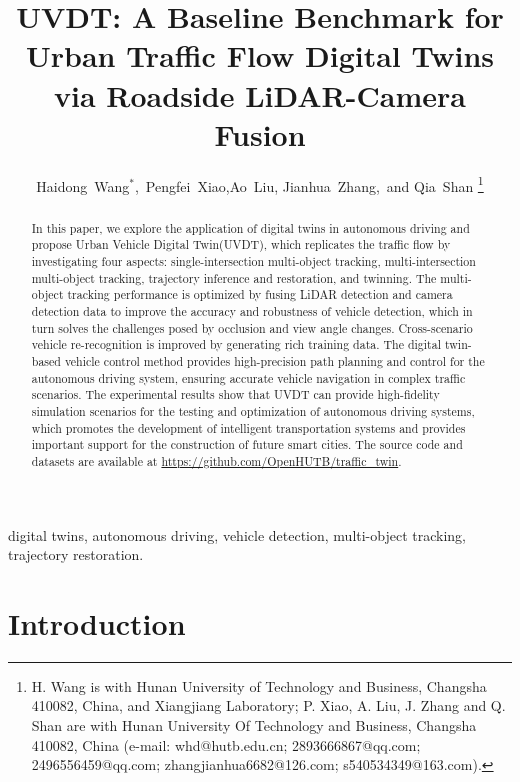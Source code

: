 \documentclass[journal,twoside,web]{ieeecolor}
\begin{document}
\title{UVDT: A Baseline Benchmark for Urban Traffic Flow Digital Twins via Roadside LiDAR-Camera Fusion}
\author{Haidong~Wang\(^*\),~Pengfei~Xiao,Ao~Liu, Jianhua~Zhang,~and Qia~Shan
\thanks{H. Wang is with Hunan University of Technology and Business, Changsha 410082, China, and Xiangjiang Laboratory; P. Xiao, A. Liu, J. Zhang and Q. Shan are with Hunan University Of Technology and Business, Changsha 410082, China (e-mail: whd@hutb.edu.cn; 2893666867@qq.com; 2496556459@qq.com; zhangjianhua6682@126.com; s540534349@163.com).}}

\maketitle

\begin{abstract}
In this paper, we explore the application of digital twins in autonomous driving and propose Urban Vehicle Digital Twin(UVDT), which replicates the traffic flow by investigating four aspects: single-intersection multi-object tracking, multi-intersection multi-object tracking, trajectory inference and restoration, and twinning. 
The multi-object tracking performance is optimized by fusing LiDAR detection and camera detection data to improve the accuracy and robustness of vehicle detection, which in turn solves the challenges posed by occlusion and view angle changes. 
Cross-scenario vehicle re-recognition is improved by generating rich training data. 
The digital twin-based vehicle control method provides high-precision path planning and control for the autonomous driving system, ensuring accurate vehicle navigation in complex traffic scenarios. 
The experimental results show that UVDT can provide high-fidelity simulation scenarios for the testing and optimization of autonomous driving systems, which promotes the development of intelligent transportation systems and provides important support for the construction of future smart cities.
The source code and datasets are available at \underline 
{https://github.com/OpenHUTB/traffic\_twin}.
\end{abstract}

\begin{IEEEkeywords}
digital twins, autonomous driving, vehicle detection, multi-object tracking, trajectory restoration.
\end{IEEEkeywords}

\section{Introduction}
\end{document}
